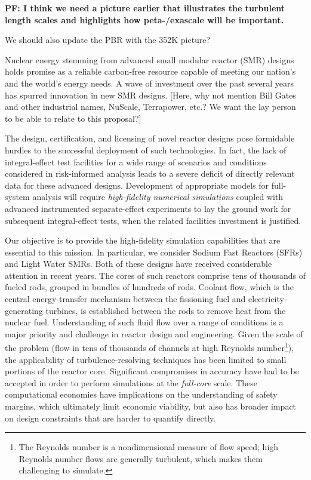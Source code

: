 

{\bf
PF:  I think we need a picture earlier that illustrates the turbulent
length scales and highlights how peta-/exascale will be important.

We should also update the PBR with the 352K picture?

}

Nuclear energy stemming from advanced small modular reactor (SMR) designs
holds promise as a reliable carbon-free resource capable of meeting our
nation's and the world's energy needs.  A wave of investment over the past
several years has spurred innovation in new SMR designs.
[Here, why not mention Bill Gates and other industrial names, NuScale,
Terrapower, etc.?  We want the lay person to be able to relate to this
proposal?]

The design, certification, and licensing of novel reactor designs pose
formidable hurdles to the successful deployment of such technologies. In fact,
the lack of integral-effect test facilities for a wide range of scenarios and
conditions considered in risk-informed analysis leads to a severe deficit of
directly relevant data for these advanced designs.  Development of  appropriate
models for full-system analysis will require {\em high-fidelity numerical
simulations} coupled with advanced instrumented separate-effect experiments to
lay the ground work for subsequent integral-effect tests, when the related
facilities investment is justified.

Our objective is to provide the high-fidelity simulation capabilities that are
essential to this mission.  In particular, we consider Sodium Fast Reactors
(SFRs) and Light Water SMRs. Both of these designs have received considerable
attention in recent years. The cores of such reactors comprise tens of
thousands of fueled rods, grouped in bundles of hundreds of rods. Coolant flow,
which is the central energy-transfer mechanism between the fissioning fuel and
electricity-generating turbines, is established between the rods to remove heat
from the nuclear fuel.  Understanding of such fluid flow over a range of
conditions is a major priority and challenge in reactor design and engineering.
Given the scale of the problem (flow in tens of thousands of channels at high
Reynolds number\footnote{The Reynolds number is a nondimensional measure of flow
speed; high Reynolds number flows are generally turbulent, which makes them
challenging to simulate.}), the
applicability of turbulence-resolving techniques has been limited to small
portions of the reactor core. Significant compromises in accuracy have had to
be accepted in order to perform simulations at the {\em full-core} scale.
These computational economies have implications on the understanding of safety
margins, which ultimately limit economic viability, but also has broader impact
on design constraints that are harder to quantify directly.

